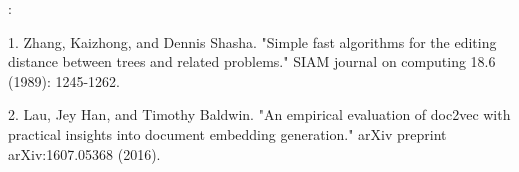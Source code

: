 \documentclass[12pt,a4paper]{article}
\begin{document}
\vspace*{.5cm}

:

1. Zhang, Kaizhong, and Dennis Shasha. "Simple fast algorithms for the editing distance between trees and related problems." SIAM journal on computing 18.6 (1989): 1245-1262. 

2. Lau, Jey Han, and Timothy Baldwin. "An empirical evaluation of doc2vec with practical insights into document embedding generation." arXiv preprint arXiv:1607.05368 (2016). 
\end{document}
